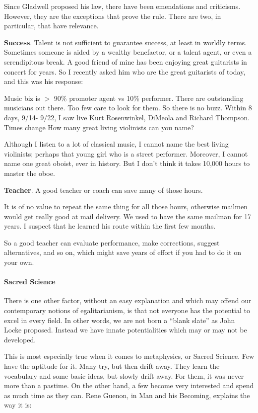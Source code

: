 Since Gladwell proposed his law, there have been emendations and criticisms. However, they are the exceptions that prove the rule. There are two, in particular, that have relevance.

\textbf{Success}. Talent is not sufficient to guarantee success, at least in worldly terms. Sometimes someone is aided by a wealthy benefactor, or a talent agent, or even a serendipitous break. A good friend of mine has been enjoying great guitarists in concert for years. So I recently asked him who are the great guitarists of today, and this was his response:

\begin{quotex}
Music biz is $>$ 90\% promoter agent vs 10\% performer. There are outstanding musicians out there. Too few care to look for them. So there is no buzz. Within 8 days, 9/14- 9/22, I saw live Kurt Rosenwinkel, DiMeola and Richard Thompson. Times change How many great living violinists can you name?
\end{quotex}

Although I listen to a lot of classical music, I cannot name the best living violinists; perhaps that young girl who is a street performer. Moreover, I cannot name one great oboist, ever in history. But I don't think it takes 10,000 hours to master the oboe.

\textbf{Teacher}. A good teacher or coach can save many of those hours.

It is of no value to repeat the same thing for all those hours, otherwise mailmen would get really good at mail delivery. We used to have the same mailman for 17 years. I suspect that he learned his route within the first few months.

So a good teacher can evaluate performance, make corrections, suggest alternatives, and so on, which might save years of effort if you had to do it on your own.

\paragraph{Sacred Science}

There is one other factor, without an easy explanation and which may offend our contemporary notions of egalitarianism, is that not everyone has the potential to excel in every field. In other words, we are not born a ``blank slate'' as John Locke proposed. Instead we have innate potentialities which may or may not be developed.

This is most especially true when it comes to metaphysics, or Sacred Science. Few have the aptitude for it. Many try, but then drift away. They learn the vocabulary and some basic ideas, but slowly drift away. For them, it was never more than a pastime. On the other hand, a few become very interested and spend as much time as they can. Rene Guenon, in Man and his Becoming, explains the way it is:

